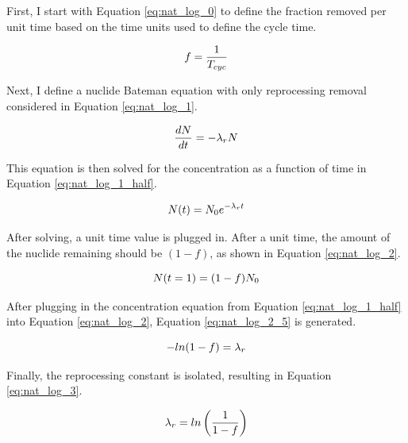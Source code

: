 First, I start with Equation \eqref{eq:nat_log_0} to define the fraction removed per unit time based on the time units used to define the cycle time.

\begin{equation} \hfill
f = \frac{1}{T_{cyc}}
\hfill\label{eq:nat_log_0} \end{equation}

Next, I define a nuclide Bateman equation with only reprocessing removal considered in Equation \eqref{eq:nat_log_1}.

\begin{equation} \hfill
\frac{dN}{dt} = -\lambda_r N
\hfill\label{eq:nat_log_1} \end{equation}

This equation is then solved for the concentration as a function of time in Equation \eqref{eq:nat_log_1_half}.

\begin{equation} \hfill
N(t) = N_0 e^{-\lambda_r t}
\hfill\label{eq:nat_log_1_half} \end{equation}

After solving, a unit time value is plugged in. After a unit time, the amount of the nuclide remaining should be $(1-f)$, as shown in Equation \eqref{eq:nat_log_2}.

\begin{equation} \hfill
N(t = 1) = (1-f) N_{0}
\hfill\label{eq:nat_log_2} \end{equation}

After plugging in the concentration equation from Equation \eqref{eq:nat_log_1_half} into Equation \eqref{eq:nat_log_2}, Equation \eqref{eq:nat_log_2_5} is generated.


\begin{equation} \hfill
-ln(1-f)  = \lambda_r
\hfill\label{eq:nat_log_2_5} \end{equation}

Finally, the reprocessing constant is isolated, resulting in Equation \eqref{eq:nat_log_3}.

\begin{equation} \hfill
\lambda_r = ln\left( \frac{1}{1-f} \right)
\hfill\label{eq:nat_log_3} \end{equation}


